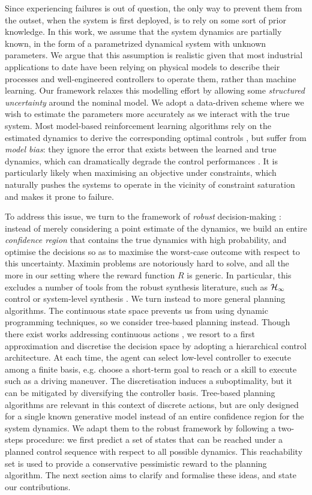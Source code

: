 \documentclass{article}
\begin{document}
Since experiencing failures is out of question, the only way to prevent them from the outset, when the system is first deployed, is to rely on some sort of prior knowledge. In this work, we assume that the system dynamics are partially known, in the form of a parametrized dynamical system with unknown parameters. We argue that this assumption is realistic given that most industrial applications to date have been relying on physical models to describe their processes and well-engineered controllers to operate them, rather than machine learning. Our framework relaxes this modelling effort by allowing some \emph{structured uncertainty} around the nominal model. We adopt a data-driven scheme where we wish to estimate the parameters more accurately as we interact with the true system. Most model-based reinforcement learning algorithms rely on the estimated dynamics to derive the corresponding optimal controls \citep[e.g.][]{Lenz2015,Levine2015}, but suffer from \emph{model bias}: they ignore the error that exists between the learned and true dynamics, which can dramatically degrade the control performances \citep{Schneider1997}. It is particularly likely when maximising an objective under constraints, which naturally pushes the systems to operate in the vicinity of constraint saturation and makes it prone to failure.

To address this issue, we turn to the framework of \emph{robust} decision-making \citep{Bental2009,Bertsimas2011,Gorissen2015}: instead of merely considering a point estimate of the dynamics, we build an entire \emph{confidence region} that contains the true dynamics with high probability, and optimise the decisions so as to maximise the worst-case outcome with respect to this uncertainty. Maximin problems are notoriously hard to solve, and all the more in our setting where the reward function $R$ is generic. In particular, this excludes a number of tools from the robust synthesis literature, such as $\mathcal{H}_\infty$ control \citep[see, e.g.][]{Basar1996} or system-level synthesis \citep{Dean2017,Dean2018}. We turn instead to more general planning algorithms. The continuous state space prevents us from using dynamic programming techniques, so we consider tree-based planning instead. Though there exist works addressing continuous actions \citep{Busoniu2018,Weinstein2012}, we resort to a first approximation and discretise the decision space by adopting a hierarchical control architecture. At each time, the agent can select low-level controller to execute among a finite basis, e.g. choose a short-term goal to reach or a skill to execute such as a driving maneuver. The discretisation induces a suboptimality, but it can be mitigated by diversifying the controller basis. Tree-based planning algorithms are relevant in this context of discrete actions, but are only designed for a single known generative model instead of an entire confidence region for the system dynamics. We adapt them to the robust framework by following a two-steps procedure: we first predict a set of states that can be reached under a planned control sequence with respect to all possible dynamics. This reachability set is used to provide a conservative pessimistic reward to the planning algorithm. The next section aims to clarify and formalise these ideas, and state our contributions.
\end{document}
